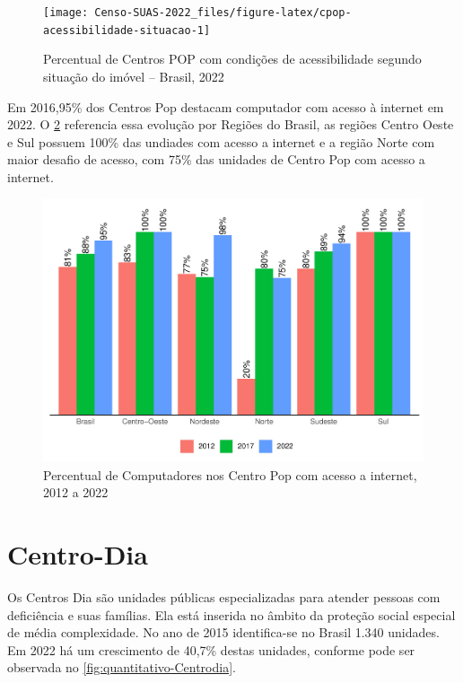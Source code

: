 \documentclass[
  brazilian]{report}
\begin{document}
\begin{figure}
\texttt{[image: Censo-SUAS-2022\_files/figure-latex/cpop-acessibilidade-situacao-1]} \caption[Percentual de Centros POP com condições de acessibilidade segundo situação do imóvel – Brasil, 2022]{Percentual de Centros POP com condições de acessibilidade segundo situação do imóvel – Brasil, 2022}\label{fig:cpop-acessibilidade-situacao}
\end{figure}

Em 2016,95\% dos Centros Pop destacam computador com acesso à internet
em 2022. O \cref{fig:cpop-internet-percentual} referencia essa evolução
por Regiões do Brasil, as regiões Centro Oeste e Sul possuem 100\% das
undiades com acesso a internet e a região Norte com maior desafio de
acesso, com 75\% das unidades de Centro Pop com acesso a internet.

\begin{figure}
\includegraphics{Censo-SUAS-2022_files/figure-latex/cpop-internet-percentual-1} \caption[Percentual de Computadores nos Centro Pop com acesso a internet, 2012 a 2022]{Percentual de Computadores nos Centro Pop com acesso a internet, 2012 a 2022}\label{fig:cpop-internet-percentual}
\end{figure}

\hypertarget{centro-dia}{%
\section{Centro-Dia}\label{centro-dia}}

Os Centros Dia são unidades públicas especializadas para atender pessoas
com deficiência e suas famílias. Ela está inserida no âmbito da proteção
social especial de média complexidade. No ano de 2015 identifica-se no
Brasil 1.340 unidades. Em 2022 há um crescimento de 40,7\% destas
unidades, conforme pode ser observada no
\cref{fig:quantitativo-Centrodia}.
\end{document}
